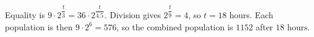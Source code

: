 Equality is $9\cdot2^{\dfrac{t}{3}}=36\cdot2^{\dfrac{t}{4.5}}$. Division gives $2^{\dfrac{t}{9}}=4$, so $t=18$ hours. Each population is then $9\cdot2^6=576$, so the combined population is $\boxed{1152}$ after $\boxed{18\text{ hours}}$.
